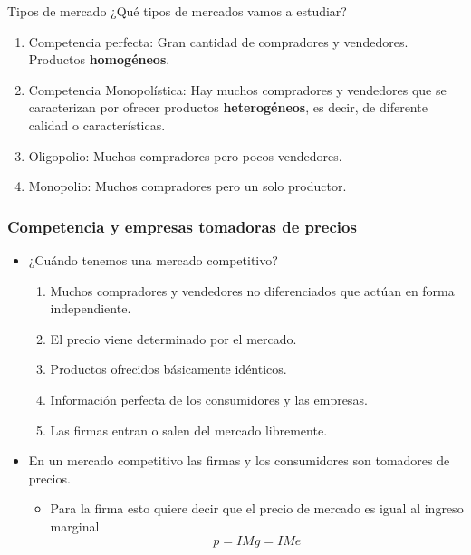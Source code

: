\documentclass{beamer}
\begin{document}
\begin{frame}{Tipos de mercado}
    ¿Qué tipos de mercados vamos a estudiar? \vspace{1mm}
    \begin{enumerate}
        \item Competencia perfecta: Gran cantidad de compradores y vendedores. Productos \textbf{homogéneos}.
        \item Competencia Monopolística: Hay muchos compradores
        y vendedores que se caracterizan por ofrecer productos \textbf{heterogéneos}, es decir, de diferente
        calidad o características.
        \item Oligopolio: Muchos compradores pero pocos vendedores.
        \item Monopolio: Muchos compradores pero un solo productor.
    \end{enumerate}
\end{frame}


\begin{frame}
\frametitle{Competencia y empresas tomadoras de precios}
\begin{itemize}
    \item ¿Cuándo tenemos una mercado competitivo?\vspace{1mm}
    \begin{enumerate}
        \item Muchos compradores y vendedores no diferenciados que actúan en forma independiente.\vspace{1mm}
        \item El precio viene determinado por el mercado.\vspace{1mm}
        \item Productos ofrecidos básicamente idénticos.\vspace{1mm}
        \item Información perfecta de los consumidores y las empresas.\vspace{1mm}
        \item Las firmas entran o salen del mercado libremente.
    \end{enumerate}
    \vspace{2mm}
    \item En un mercado competitivo las firmas y los consumidores son tomadores de precios.\vspace{1mm}
    \begin{itemize}
        \item Para la firma esto quiere decir que el precio de mercado es igual al ingreso marginal
        \[ p = IMg = IMe \]
    \end{itemize}
\end{itemize}
\end{frame}
\end{document}
